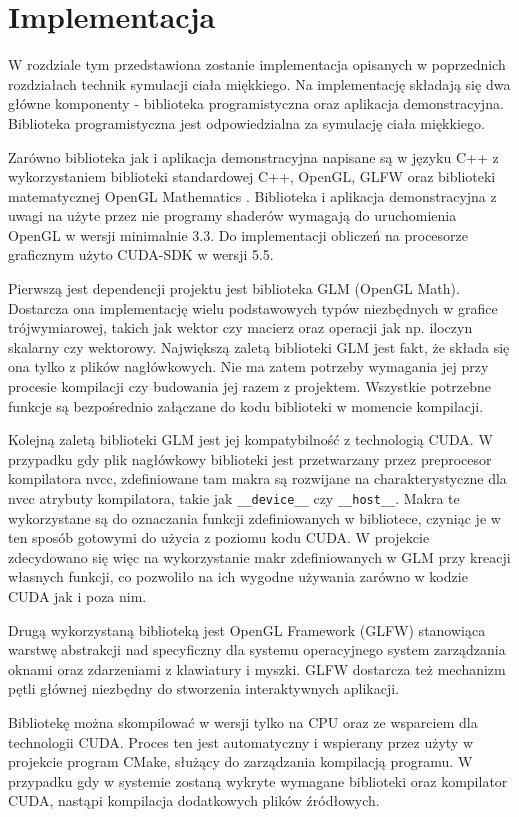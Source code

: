 \chapter{Implementacja}
W rozdziale tym przedstawiona zostanie implementacja opisanych w poprzednich
rozdziałach technik symulacji ciała miękkiego. Na implementację składają się dwa
główne komponenty - biblioteka programistyczna oraz aplikacja demonstracyjna.
Biblioteka programistyczna jest odpowiedzialna za symulację ciała miękkiego.

Zarówno biblioteka jak i aplikacja demonstracyjna napisane są w języku C++ z
wykorzystaniem biblioteki standardowej C++, OpenGL, GLFW \cite{glfw} oraz
biblioteki matematycznej OpenGL Mathematics \cite{glm}. Biblioteka i aplikacja
demonstracyjna z uwagi na użyte przez nie programy shaderów wymagają do
uruchomienia OpenGL w wersji minimalnie 3.3. Do implementacji obliczeń
na procesorze graficznym użyto CUDA-SDK w wersji 5.5.

Pierwszą jest dependencji projektu jest biblioteka GLM (OpenGL Math). Dostarcza
ona implementację wielu podstawowych typów niezbędnych w grafice trójwymiarowej,
	takich jak wektor czy macierz oraz operacji jak np. iloczyn skalarny czy
	wektorowy. Największą zaletą biblioteki GLM jest fakt, że składa się ona
	tylko z plików nagłówkowych. Nie ma zatem potrzeby wymagania jej przy
	procesie kompilacji czy budowania jej razem z projektem. Wszystkie potrzebne
	funkcje są bezpośrednio załączane do kodu biblioteki w momencie kompilacji.

Kolejną zaletą biblioteki GLM jest jej kompatybilność z technologią CUDA. W przypadku
gdy plik nagłówkowy biblioteki jest przetwarzany przez preprocesor kompilatora
nvcc, zdefiniowane tam makra są rozwijane na charakterystyczne dla nvcc
atrybuty kompilatora, takie jak \texttt{\_\_device\_\_} czy \texttt{\_\_host\_\_}.
Makra te wykorzystane są do oznaczania funkcji zdefiniowanych w bibliotece,
	  czyniąc je w ten sposób gotowymi do użycia z poziomu kodu CUDA. W projekcie zdecydowano się więc na
wykorzystanie makr zdefiniowanych w GLM przy kreacji własnych funkcji, co
pozwoliło na ich wygodne używania zarówno w kodzie CUDA jak i poza nim.

Drugą wykorzystaną biblioteką jest OpenGL Framework (GLFW) stanowiąca warstwę
abstrakcji nad specyficzny dla systemu operacyjnego system zarządzania oknami
oraz zdarzeniami z klawiatury i myszki. GLFW dostarcza też mechanizm pętli głównej
niezbędny do stworzenia interaktywnych aplikacji.

Bibliotekę można skompilować w wersji tylko na CPU oraz ze wsparciem dla technologii
CUDA.  Proces ten jest automatyczny i wspierany przez użyty w projekcie program
CMake, służący do zarządzania kompilacją programu. W przypadku gdy w systemie
zostaną wykryte wymagane biblioteki oraz kompilator CUDA, nastąpi kompilacja
dodatkowych plików źródłowych.

